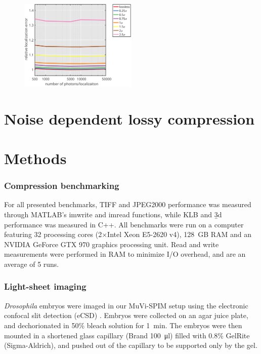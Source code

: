     \begin{figure}[tpb]
      \centering
      \includegraphics[page=1,width=0.5\textwidth]{SFig6_locprecVsNphotons}
      \label{fig:SFig6_locprecVsNphotons}
    \end{figure}

\section{Noise dependent lossy compression}

\section{Methods}
  
\subsubsection{Compression benchmarking}
For all presented benchmarks, TIFF and JPEG2000 performance was measured through MATLAB's imwrite and imread functions, while KLB and \b3d performance was measured in C++. All benchmarks were run on a computer featuring 32 processing cores (2×Intel Xeon E5-2620 v4), \SI{128}{GB} RAM and an NVIDIA GeForce GTX 970 graphics processing unit. Read and write measurements were performed in RAM to minimize I/O overhead, and are an average of 5 runs.

\subsubsection{Light-sheet imaging}
\textit{Drosophila} embryos were imaged in our MuVi-SPIM setup \cite{krzic_multiview_2012} using the electronic confocal slit detection (eCSD) \cite{de_medeiros_confocal_2015}. Embryos were collected on an agar juice plate, and dechorionated in 50\% bleach solution for \SI{1}{min}. The embryos were then mounted in a shortened glass capillary (Brand \SI{100}{\micro l}) filled with 0.8\% GelRite (Sigma-Aldrich), and pushed out of the capillary to be supported only by the gel.

